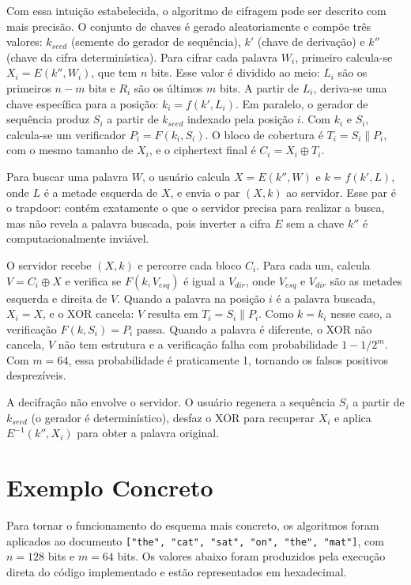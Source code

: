 \documentclass[
  12pt,
  oneside,
  a4paper,
  brazil
]{abntex2}
\begin{document}
Com essa intuição estabelecida, o algoritmo de cifragem pode ser
descrito com mais precisão. O conjunto de chaves é gerado aleatoriamente
e compõe três valores: $k_{\mathit{seed}}$ (semente do gerador de
sequência), $k'$ (chave de derivação) e $k''$ (chave da cifra
determinística). Para cifrar cada palavra $W_i$, primeiro calcula-se
$X_i = E(k'', W_i)$, que tem $n$ bits. Esse valor é dividido ao meio:
$L_i$ são os primeiros $n{-}m$ bits e $R_i$ são os últimos $m$ bits.
A partir de $L_i$, deriva-se uma chave específica para a posição:
$k_i = f(k', L_i)$. Em paralelo, o gerador de sequência produz $S_i$
a partir de $k_{\mathit{seed}}$ indexado pela posição $i$. Com $k_i$ e
$S_i$, calcula-se um verificador $P_i = F(k_i, S_i)$. O bloco de
cobertura é $T_i = S_i \| P_i$, com o mesmo tamanho de $X_i$, e o
ciphertext final é $C_i = X_i \oplus T_i$.

Para buscar uma palavra $W$, o usuário calcula $X = E(k'', W)$ e
$k = f(k', L)$, onde $L$ é a metade esquerda de $X$, e envia o par
$(X, k)$ ao servidor. Esse par é o trapdoor: contém exatamente o que
o servidor precisa para realizar a busca, mas não revela a palavra
buscada, pois inverter a cifra $E$ sem a chave $k''$ é
computacionalmente inviável.

O servidor recebe $(X, k)$ e percorre cada bloco $C_i$. Para cada um,
calcula $V = C_i \oplus X$ e verifica se $F(k, V_{\mathit{esq}})$ é
igual a $V_{\mathit{dir}}$, onde $V_{\mathit{esq}}$ e $V_{\mathit{dir}}$
são as metades esquerda e direita de $V$. Quando a palavra na posição
$i$ é a palavra buscada, $X_i = X$, e o XOR cancela: $V$ resulta em
$T_i = S_i \| P_i$. Como $k = k_i$ nesse caso, a verificação
$F(k, S_i) = P_i$ passa. Quando a palavra é diferente, o XOR não
cancela, $V$ não tem estrutura e a verificação falha com probabilidade
$1 - 1/2^m$. Com $m = 64$, essa probabilidade é praticamente 1,
tornando os falsos positivos desprezíveis.

A decifração não envolve o servidor. O usuário regenera a sequência
$S_i$ a partir de $k_{\mathit{seed}}$ (o gerador é determinístico),
desfaz o XOR para recuperar $X_i$ e aplica $E^{-1}(k'', X_i)$ para
obter a palavra original.

\section{Exemplo Concreto}

Para tornar o funcionamento do esquema mais concreto, os algoritmos
foram aplicados ao documento \texttt{["the", "cat", "sat", "on",
"the", "mat"]}, com $n = 128$ bits e $m = 64$ bits. Os valores abaixo
foram produzidos pela execução direta do código implementado e estão
representados em hexadecimal.
\end{document}
